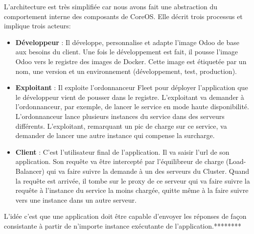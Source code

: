 \begin{onehalfspace}
L'architecture est très simplifiée car nous avons fait une abstraction du comportement interne des composants de CoreOS. Elle décrit trois processus et implique trois acteurs:


\begin{itemize}
 	\item \textbf{Développeur} : Il développe, personnalise et adapte l'image Odoo de base aux besoins du client. Une fois le développement est fait, il pousse l'image Odoo vers le registre des images de Docker. Cette image est étiquetée par un nom, une version et un environnement (développement, test, production).
 	\item \textbf{Exploitant} : Il exploite l'ordonnanceur Fleet pour déployer l'application que le développeur vient de pousser dans le registre. L'exploitant va demander à l'ordonnanceur, par exemple, de lancer le service en mode haute disponibilité. L'ordonnanceur lance plusieurs instances du service dans des serveurs différents. L'exploitant, remarquant un pic de charge sur ce service, va demander de lancer une autre instance qui compense la surcharge.
 	\item \textbf{Client} : C'est l'utilisateur final de l'application. Il va saisir l'\acrshort{url} de son application. Son requête va être intercepté par l'équilibreur de charge (Load-Balancer) qui va faire suivre la demande à un des serveurs du Cluster. Quand la requête est arrivée, il tombe sur le proxy de ce serveur qui va faire suivre la requête à l'instance du service la moins chargée, quitte même à la faire suivre vers une instance dans un autre serveur.
 \end{itemize} 


L'idée c'est que une application doit être capable d'envoyer les réponses de façon consistante à partir de n'importe instance exécutante de l'application.********


\end{onehalfspace}
